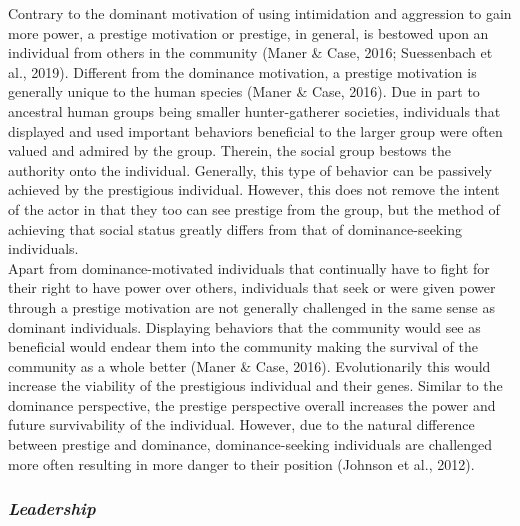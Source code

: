 \documentclass[
  english,
  a4paper,floatsintext]{apa7}
\begin{document}
Contrary to the dominant motivation of using intimidation and aggression to gain more power, a prestige motivation or prestige, in general, is bestowed upon an individual from others in the community (Maner \& Case, 2016; Suessenbach et al., 2019). Different from the dominance motivation, a prestige motivation is generally unique to the human species (Maner \& Case, 2016). Due in part to ancestral human groups being smaller hunter-gatherer societies, individuals that displayed and used important behaviors beneficial to the larger group were often valued and admired by the group. Therein, the social group bestows the authority onto the individual. Generally, this type of behavior can be passively achieved by the prestigious individual. However, this does not remove the intent of the actor in that they too can see prestige from the group, but the method of achieving that social status greatly differs from that of dominance-seeking individuals.\\
Apart from dominance-motivated individuals that continually have to fight for their right to have power over others, individuals that seek or were given power through a prestige motivation are not generally challenged in the same sense as dominant individuals. Displaying behaviors that the community would see as beneficial would endear them into the community making the survival of the community as a whole better (Maner \& Case, 2016). Evolutionarily this would increase the viability of the prestigious individual and their genes. Similar to the dominance perspective, the prestige perspective overall increases the power and future survivability of the individual. However, due to the natural difference between prestige and dominance, dominance-seeking individuals are challenged more often resulting in more danger to their position (Johnson et al., 2012).

\hypertarget{leadership}{%
\subsubsection{\texorpdfstring{\emph{Leadership}}{Leadership}}\label{leadership}}
\end{document}
